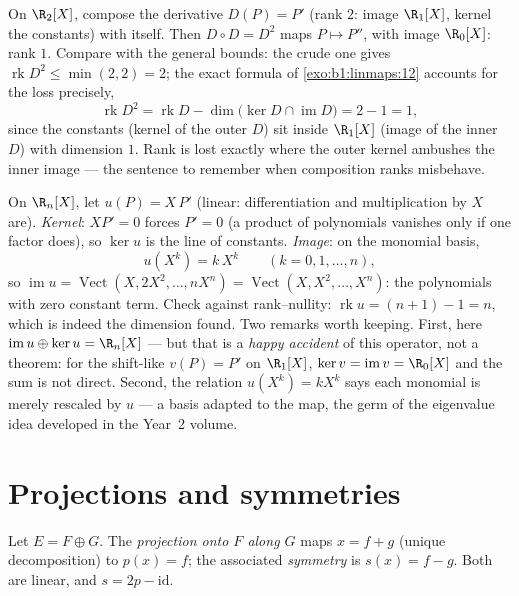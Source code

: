 \begin{example}
\label{ex:b1:linmaps:rankbookkeeping}
On $\R_2[X]$, compose the derivative $D(P) = P'$ (rank $2$:
image $\R_1[X]$, kernel the constants) with itself. Then $D
\circ D = D^2$ maps $P \mapsto P''$, with image $\R_0[X]$: rank
$1$. Compare with the general bounds: the crude one gives
$\operatorname{rk} D^2 \leq \min(2, 2) = 2$; the exact formula
of \cref{exo:b1:linmaps:12} accounts for the loss precisely,
\[
\operatorname{rk} D^2 = \operatorname{rk} D -
\dim\bigl(\ker D \cap \operatorname{im} D\bigr) = 2 - 1 = 1 ,
\]
since the constants (kernel of the outer $D$) sit inside
$\R_1[X]$ (image of the inner $D$) with dimension $1$. Rank is
lost exactly where the outer kernel ambushes the inner image
--- the sentence to remember when composition ranks misbehave.
\end{example}

\begin{example}
\label{ex:b1:linmaps:euler}
On $\R_n[X]$, let $u(P) = X\,P'$ (linear: differentiation and
multiplication by $X$ are). \emph{Kernel}: $XP' = 0$ forces $P' =
0$ (a product of polynomials vanishes only if one factor does),
so $\ker u$ is the line of constants. \emph{Image}: on the
monomial basis,
\[
u(X^k) = k\,X^{k} \qquad (k = 0, 1, \dots, n),
\]
so $\operatorname{im} u = \operatorname{Vect}(X, 2X^2, \dots,
nX^n) = \operatorname{Vect}(X, X^2, \dots, X^n)$: the
polynomials with zero constant term. Check against rank--nullity:
$\operatorname{rk} u = (n + 1) - 1 = n$, which is indeed the
dimension found. Two remarks worth keeping. First, here
$\operatorname{im} u \oplus \ker u = \R_n[X]$ --- but that is a
\emph{happy accident} of this operator, not a theorem: for the
shift-like $v(P) = P'$ on $\R_1[X]$, $\ker v = \operatorname{im}
v = \R_0[X]$ and the sum is not direct. Second, the relation
$u(X^k) = kX^k$ says each monomial is merely rescaled by $u$ ---
a basis adapted to the map, the germ of the eigenvalue idea
developed in the Year~2 volume.
\end{example}

\section{Projections and symmetries}

\begin{definition}\label{def:b1:linmaps:projection}
Let $E = F \oplus G$. The \emph{projection onto $F$ along
$G$} maps $x = f + g$ (unique decomposition) to
$p(x) = f$; the associated \emph{symmetry} is $s(x)
= f - g$. Both are linear, and $s = 2p - \mathrm{id}$.
\end{definition}


